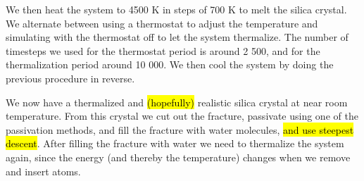We then heat the system to 4500 K in steps of 700 K to melt the silica crystal. We alternate between using a thermostat to adjust the temperature and simulating with the thermostat off to let the system thermalize. The number of timesteps we used for the thermostat period is around 2 500, and for the thermalization period around 10 000. We then cool the system by doing the previous procedure in reverse.

We now have a thermalized and \hl{(hopefully)} realistic silica crystal at near room temperature. From this crystal we cut out the fracture, passivate using one of the passivation methods, and fill the fracture with water molecules, \hl{and use steepest descent}. After filling the fracture with water we need to thermalize the system again, since the energy (and thereby the temperature) changes when we remove and insert atoms.

